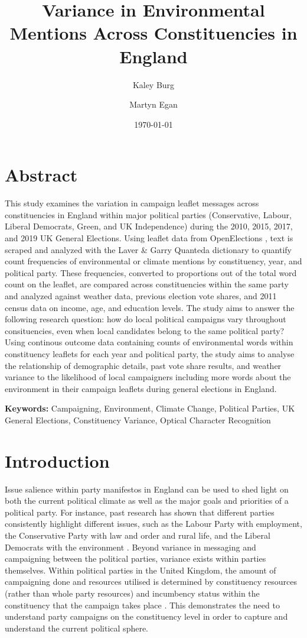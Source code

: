 \documentclass[preprint,12pt,authoryear]{elsarticle}
\title{Variance in Environmental Mentions Across Constituencies in England}
\author[1]{Kaley Burg\texorpdfstring{\fnref{fn1}}{}}
\author[2]{Martyn Egan\texorpdfstring{\corref{cor1}}{}}
\date{\today} %
\begin{document}
\section{Abstract}
\noindent
This study examines the variation in campaign leaflet messages across constituencies in England within major political parties (Conservative, Labour, Liberal Democrats, Green, and UK Independence) during the 2010, 2015, 2017, and 2019 UK General Elections. Using leaflet data from OpenElections \citep{milazzo2020openelections}, text is scraped and analyzed with the Laver \& Garry Quanteda dictionary \citep{laverEstimatingPolicyPositions2000} to quantify count frequencies of environmental or climate mentions by constituency, year, and political party. These frequencies, converted to proportions out of the total word count on the leaflet, are compared across constituencies within the same party and analyzed against weather data, previous election vote shares, and 2011 census data on income, age, and education levels. The study aims to answer the following research question: how do local political campaigns vary throughout consituencies, even when local candidates belong to the same political party? Using continous outcome data containing counts of environmental words within constituency leaflets for each year and political party, the study aims to analyse the relationship of demographic details, past vote share results, and weather variance to the likelihood of local campaigners including more words about the environment in their campaign leaflets during general elections in England.

\vspace{0.5cm}

\noindent
\textbf{Keywords:} Campaigning, Environment, Climate Change, Political Parties, UK General Elections, Constituency Variance, Optical Character Recognition
\vspace{0.5cm}





\newpage
	\section{Introduction}
	
Issue salience within party manifestos in England can be used to shed light on both the current political climate as well as the major goals and priorities of a political party. For instance, past research has shown that different parties consistently highlight different issues, such as the Labour Party with employment, the Conservative Party with law and order and rural life, and the Liberal Democrats with the environment \citep{pogorelisIssueSalienceRegional2005}. Beyond variance in messaging and campaigning between the political parties, variance exists within parties themselves. Within political parties in the United Kingdom, the amount of campaigning done and resources utilised is determined by constituency resources (rather than whole party resources) and incumbency status within the constituency that the campaign takes place \citep{pattieIncumbentPartiesIncumbent2017a}. This demonstrates the need to understand party campaigns on the constituency level in order to capture and understand the current political sphere.
\end{document}
